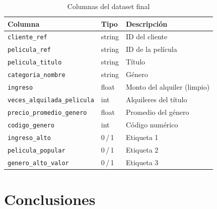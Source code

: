 \documentclass[12pt,a4paper]{article}
\begin{document}
\begin{table}[H]
  \centering
  \caption{Columnas del dataset final}
  \begin{tabular}{lll}
    \toprule
    \textbf{Columna}                    & \textbf{Tipo}  & \textbf{Descripci\'on} \\
    \midrule
    \texttt{cliente\_ref}               & string  & ID del cliente \\
    \texttt{pelicula\_ref}              & string  & ID de la pel\'icula \\
    \texttt{pelicula\_titulo}           & string  & T\'itulo \\
    \texttt{categoria\_nombre}          & string  & G\'enero \\
    \texttt{ingreso}                    & float   & Monto del alquiler (limpio) \\
    \texttt{veces\_alquilada\_pelicula} & int     & Alquileres del t\'itulo \\
    \texttt{precio\_promedio\_genero}   & float   & Promedio del g\'enero \\
    \texttt{codigo\_genero}             & int     & C\'odigo num\'erico \\
    \texttt{ingreso\_alto}              & 0\,/\,1 & Etiqueta 1 \\
    \texttt{pelicula\_popular}          & 0\,/\,1 & Etiqueta 2 \\
    \texttt{genero\_alto\_valor}        & 0\,/\,1 & Etiqueta 3 \\
    \bottomrule
  \end{tabular}
\end{table}

\section{Conclusiones}
\end{document}
